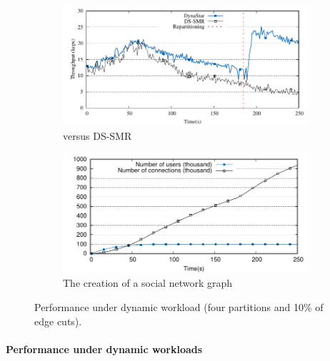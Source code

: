 \begin{figure}[h!]
  \centering
  \begin{subfigure}[b]{0.45\textwidth}
    \centering
    \includegraphics[width=0.95\columnwidth]{figures/experiments/social-network-dynamic/social-network-dynamic}
    \caption{\dynastar versus DS-SMR}
  \end{subfigure}
  \begin{subfigure}[b]{0.45\textwidth}
    \centering
    \includegraphics[width=0.95\columnwidth]{figures/experiments/social-network-dynamic/social-network-dynamic-structure}
    \caption{The creation of a social network graph}
  \end{subfigure}
    \caption{Performance under dynamic workload (four partitions and 10\% of edge cuts).}
	\label{fig:dynamic_load_tput}
\end{figure}


\paragraph*{Performance under dynamic workloads}

